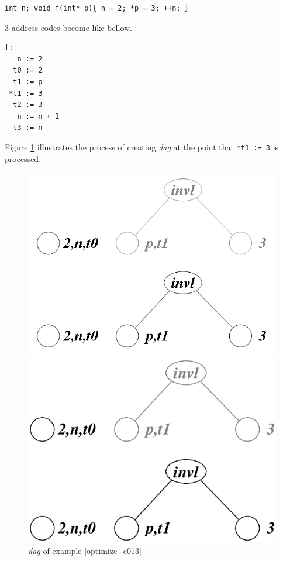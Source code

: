 \begin{Example}
\label{optimize_e013}
\begin{verbatim}
int n; void f(int* p){ n = 2; *p = 3; ++n; }
\end{verbatim}
3 address codes become like bellow.
\begin{verbatim}
f:
   n := 2
  t0 := 2
  t1 := p
 *t1 := 3
  t2 := 3
   n := n + 1
  t3 := n
\end{verbatim}
Figure \ref{optimize_e014} illustrates the process of creating
{\em dag} at the point that {\tt{*t1 := 3}} is processed.
\begin{figure}[htbp]
\begin{center}
\begin{htmlonly}
\includegraphics[width=1.0\linewidth,height=0.729\linewidth]{opt004.png}
\end{htmlonly}
\begin{latexonly}
\includegraphics[width=1.0\linewidth,height=0.729\linewidth]{opt004.eps}
\end{latexonly}
\caption{{\em dag} of example \ref{optimize_e013}}
\label{optimize_e014}
\end{center}
\end{figure}


\end{Example}
